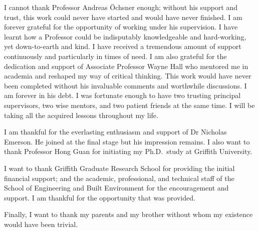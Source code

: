 
	\vspace{-2\baselineskip}
	I cannot thank Professor Andreas \"Ochsner enough; without his support and trust, this work could never have started and would have never finished. I am forever grateful for the opportunity of working under his supervision. I have learnt how a Professor could be indisputably knowledgeable and hard-working, yet down-to-earth and kind. I have received a tremendous amount of support continuously and particularly in times of need. I am also grateful for the dedication and support of Associate Professor Wayne Hall who mentored me in academia and reshaped my way of critical thinking. This work would have never been completed without his invaluable comments and worthwhile discussions. I am forever in his debt. I was fortunate enough to have two trusting principal supervisors, two wise mentors, and two patient friends at the same time. I will be taking all the acquired lessons throughout my life.
	
	I am thankful for the everlasting enthusiasm and support of Dr Nicholas Emerson. He joined at the final stage but his impression remains. I also want to thank Professor Hong Guan for initiating my Ph.D.~study at Griffith University. 
	
	I want to thank Griffith Graduate Research School for providing the initial financial support; and the academic, professional, and technical staff of the School of Engineering and Built Environment for the encouragement and support. I am thankful for the opportunity that was provided.
 
	Finally, I want to thank my parents and my brother without whom my existence would have been trivial.